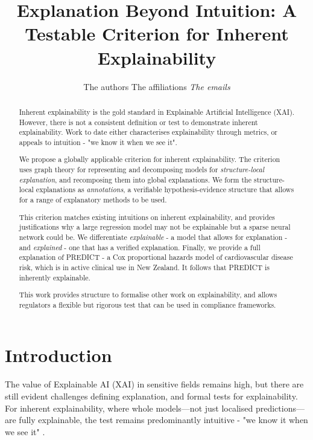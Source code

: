 \documentclass{article}
\title{Explanation Beyond Intuition: A Testable Criterion for Inherent Explainability}
\author{
The authors
\affiliations
The affiliations
\emails
\textit{The emails}
}
\begin{document}
\maketitle

\begin{abstract}

Inherent explainability is the gold standard in Explainable Artificial Intelligence (XAI). However, there is not a consistent definition or test to demonstrate inherent explainability. Work to date either characterises explainability through metrics, or appeals to intuition - "we know it when we see it".

We propose a globally applicable criterion for inherent explainability. The criterion uses graph theory for representing and decomposing models for \textit{structure-local explanation}, and recomposing them into global explanations. We form the structure-local explanations as \textit{annotations}, a verifiable hypothesis-evidence structure that allows for a range of explanatory methods to be used.

This criterion matches existing intuitions on inherent explainability, and provides justifications why a large regression model may not be explainable but a sparse neural network could be. We differentiate \textit{explainable} - a model that allows for explanation - and \textit{explained} - one that has a verified explanation. Finally, we provide a full explanation of PREDICT - a Cox proportional hazards model of cardiovascular disease risk, which is in active clinical use in New Zealand. It follows that PREDICT is inherently explainable.

This work provides structure to formalise other work on explainability, and allows regulators a flexible but rigorous test that can be used in compliance frameworks.

\end{abstract}

\section{Introduction}

The value of Explainable AI (XAI) in sensitive fields remains high, but there are still evident challenges defining explanation, and formal tests for explainability. For inherent explainability, where whole models—not just localised predictions—are fully explainable, the test remains predominantly intuitive - "we know it when we see it" \cite{doshi2017towards}.
\end{document}
